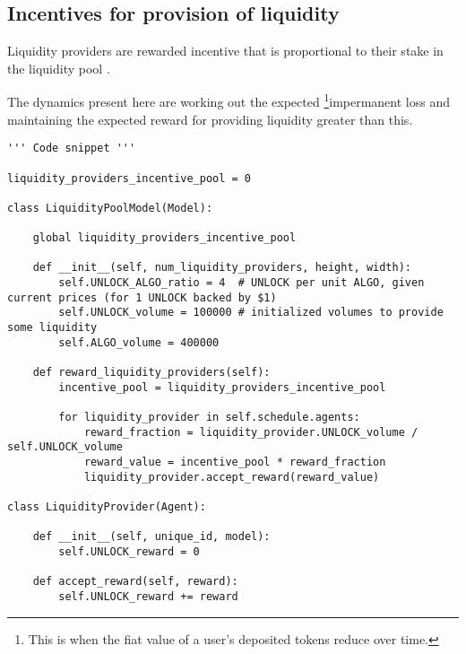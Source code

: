 \documentclass{article}
\begin{document}
\subsection{Incentives for provision of liquidity}
Liquidity providers are rewarded incentive that is proportional to their stake in the liquidity pool \cite{incentiveStructuresHülsemann}.

\noindent The dynamics present here are working out the expected \footnote{This is when the fiat value of a user's deposited tokens reduce over time.}impermanent loss and maintaining the expected reward for providing liquidity greater than this.

\begin{lstlisting}
''' Code snippet '''

liquidity_providers_incentive_pool = 0

class LiquidityPoolModel(Model):

    global liquidity_providers_incentive_pool

    def __init__(self, num_liquidity_providers, height, width):
        self.UNLOCK_ALGO_ratio = 4  # UNLOCK per unit ALGO, given current prices (for 1 UNLOCK backed by $1)
        self.UNLOCK_volume = 100000 # initialized volumes to provide some liquidity
        self.ALGO_volume = 400000

    def reward_liquidity_providers(self):
        incentive_pool = liquidity_providers_incentive_pool

        for liquidity_provider in self.schedule.agents:
            reward_fraction = liquidity_provider.UNLOCK_volume / self.UNLOCK_volume
            reward_value = incentive_pool * reward_fraction
            liquidity_provider.accept_reward(reward_value)

class LiquidityProvider(Agent):

    def __init__(self, unique_id, model):
        self.UNLOCK_reward = 0

    def accept_reward(self, reward):
        self.UNLOCK_reward += reward

\end{lstlisting}
\end{document}
